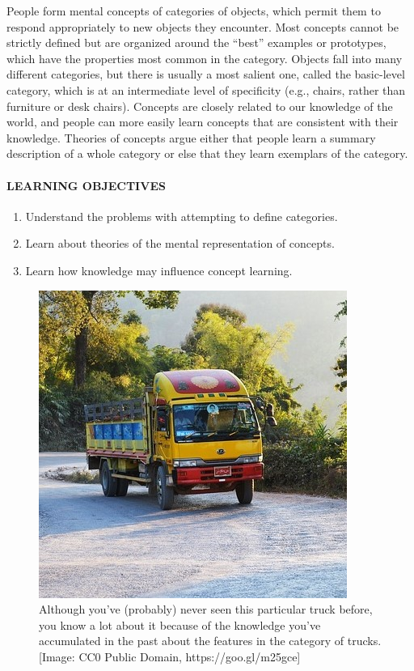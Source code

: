 \documentclass[
]{krantz}
\providecommand{\tightlist}{%
  \setlength{\itemsep}{0pt}\setlength{\parskip}{0pt}}
\begin{document}
People form mental concepts of categories of objects, which permit them to respond appropriately to new objects they encounter. Most concepts cannot be strictly defined but are organized around the ``best'' examples or prototypes, which have the properties most common in the category. Objects fall into many different categories, but there is usually a most salient one, called the basic-level category, which is at an intermediate level of specificity (e.g., chairs, rather than furniture or desk chairs). Concepts are closely related to our knowledge of the world, and people can more easily learn concepts that are consistent with their knowledge. Theories of concepts argue either that people learn a summary description of a whole category or else that they learn exemplars of the category.

\hypertarget{learning-objectives-6}{%
\paragraph*{LEARNING OBJECTIVES}\label{learning-objectives-6}}

\begin{enumerate}
\def\labelenumi{\arabic{enumi}.}
\tightlist
\item
  Understand the problems with attempting to define categories.
\item
  Learn about theories of the mental representation of concepts.
\item
  Learn how knowledge may influence concept learning.
\end{enumerate}

\begin{figure}

{\centering \includegraphics[width=0.5\linewidth]{images/ch7/truck} 

}

\caption{Although you’ve (probably) never seen this particular truck before, you know a lot about it because of the knowledge you’ve accumulated in the past about the features in the category of trucks. [Image: CC0 Public Domain, https://goo.gl/m25gce]}\label{fig:truck}
\end{figure}
\end{document}
